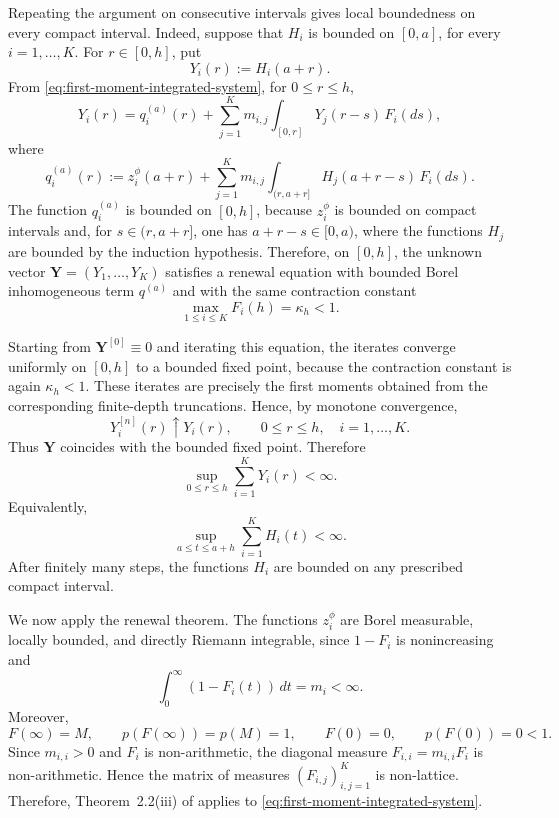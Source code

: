 \documentclass[reqno,final,11pt]{amsart}
\newcommand{\1}{\mathbbm{1}}
\renewcommand{\cite}{\citet}
\theoremstyle{plain}
\theoremstyle{definition}
\theoremstyle{remark}
\begin{document}
Repeating the argument on consecutive intervals gives local boundedness on
every compact interval. Indeed, suppose that \(H_i\) is bounded on
\([0,a]\), for every \(i=1,\ldots,K\). For \(r\in[0,h]\), put
\[
Y_i(r):=H_i(a+r).
\]
From \eqref{eq:first-moment-integrated-system}, for \(0\le r\le h\),
\[
Y_i(r)
=
q_i^{(a)}(r)
+
\sum_{j=1}^K m_{i,j}
\int_{[0,r]}Y_j(r-s)\,F_i(ds),
\]
where
\[
q_i^{(a)}(r)
:=
z_i^\phi(a+r)
+
\sum_{j=1}^K m_{i,j}
\int_{(r,a+r]}H_j(a+r-s)\,F_i(ds).
\]
The function \(q_i^{(a)}\) is bounded on \([0,h]\), because
\(z_i^\phi\) is bounded on compact intervals and, for \(s\in(r,a+r]\), one
has \(a+r-s\in[0,a)\), where the functions \(H_j\) are bounded by the
induction hypothesis. Therefore, on \([0,h]\), the unknown vector
\(\mathbf Y=(Y_1,\ldots,Y_K)\) satisfies a renewal equation with bounded
Borel inhomogeneous term \(q^{(a)}\) and with the same contraction constant
\[
\max_{1\le i\le K}F_i(h)=\kappa_h<1.
\]

Starting from \(\mathbf Y^{[0]}\equiv0\) and iterating this equation, the
iterates converge uniformly on \([0,h]\) to a bounded fixed point, because the
contraction constant is again \(\kappa_h<1\). These iterates are precisely the first moments obtained from the corresponding
finite-depth truncations. Hence, by monotone convergence,
\[
Y_i^{[n]}(r)\uparrow Y_i(r),
\qquad 0\le r\le h,\quad i=1,\ldots,K.
\]
Thus \(\mathbf Y\) coincides with the bounded fixed point. Therefore
\[
\sup_{0\le r\le h}\sum_{i=1}^K Y_i(r)<\infty.
\]
Equivalently,
\[
\sup_{a\le t\le a+h}\sum_{i=1}^K H_i(t)<\infty.
\]
After finitely many steps, the functions \(H_i\) are bounded on any prescribed
compact interval.

We now apply the renewal theorem. The functions \(z_i^\phi\) are Borel
measurable, locally bounded, and directly Riemann integrable, since
\(1-F_i\) is nonincreasing and
\[
\int_0^\infty (1-F_i(t))\,dt=m_i<\infty.
\]
Moreover,
\[
F(\infty)=M,
\qquad
p(F(\infty))=p(M)=1,
\qquad
F(0)=0,
\qquad
p(F(0))=0<1.
\]
Since \(m_{i,i}>0\) and \(F_i\) is non-arithmetic, the diagonal measure
\(F_{i,i}=m_{i,i}F_i\) is non-arithmetic. Hence the matrix of measures
\((F_{i,j})_{i,j=1}^K\) is non-lattice. Therefore,
Theorem~2.2\textup{(iii)} of \cite{Athreya2} applies to
\eqref{eq:first-moment-integrated-system}.
\end{document}
